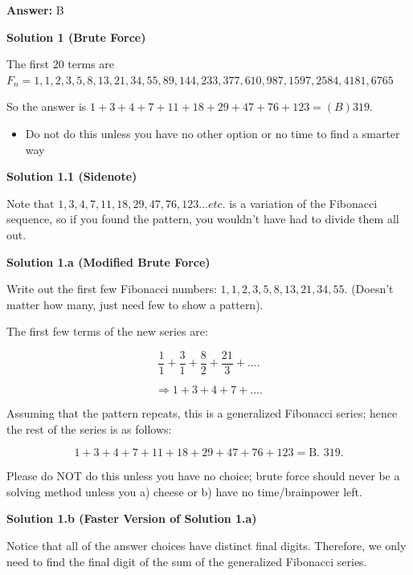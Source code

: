 \begin{enumerate}
 \textbf{Answer: }B



\textbf{Solution 1 (Brute Force)}

The first $20$ terms are $F_n = 1, 1, 2, 3, 5, 8, 13, 21, 34, 55, 89, 144, 233, 377, 610, 987, 1597, 2584, 4181, 6765$

 So the answer is $1 +  3 + 4 + 7 + 11 + 18 + 29 + 47 + 76 + 123 =  \boxed{(B) 319}$. 

 
            \begin{itemize}
        \item Do not do this unless you have no other option or no time to find a smarter way
            \end{itemize}
            



\textbf{Solution 1.1 (Sidenote)}

Note that $1, 3, 4, 7, 11, 18, 29, 47, 76, 123... etc.$ is a variation of the Fibonacci sequence, so if you found the pattern, you wouldn't have had to divide them all out.

 



\textbf{Solution 1.a (Modified Brute Force)}

Write out the first few Fibonacci numbers: $1, 1, 2, 3, 5, 8, 13, 21, 34, 55.$ (Doesn't matter how many, just need few to show a pattern). 

 The first few terms of the new series are: 

 
 \[\frac{1}{1} + \frac{3}{1} + \frac{8}{2} + \frac{21}{3} + ... .\]

 \[\Rightarrow 1 + 3 + 4+ 7 + ... .\]

 Assuming that the pattern repeats, this is a generalized Fibonacci series; hence the rest of the series is as follows: 

 
 \[1 + 3 + 4 + 7 + 11 + 18 + 29 + 47 + 76 + 123 = \boxed{\text{B. } 319}.\]

 Please do NOT do this unless you have no choice; brute force should never be a solving method unless you a) cheese or b) have no time/brainpower left.

 



\textbf{Solution 1.b (Faster Version of Solution 1.a)}

Notice that all of the answer choices have distinct final digits. Therefore, we only need to find the final digit of the sum of the generalized Fibonacci series.


\end{enumerate}
